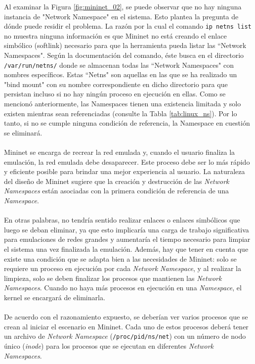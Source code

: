 Al examinar la Figura \ref{fig:mininet_02}, se puede observar que no hay ninguna instancia de "Network Namespace" en el sistema. Esto plantea la pregunta de dónde puede residir el problema. La razón por la cual el comando \texttt{ip netns list} no muestra ninguna información es que Mininet no está creando el enlace simbólico (softlink) necesario para que la herramienta pueda listar las ``Network Namespaces". Según la documentación del comando, éste busca en el directorio \texttt{/var/run/netns/} donde se almacenan todas las ``Network Namespaces" con nombres específicos. Estas ``Netns" son aquellas en las que se ha realizado un "bind mount" con su nombre correspondiente en dicho directorio para que persistan incluso si no hay ningún proceso en ejecución en ellas. Como se mencionó anteriormente, las Namespaces tienen una existencia limitada y solo existen mientras sean referenciadas (consulte la Tabla \ref{tab:linux_ns}). Por lo tanto, si no se cumple ninguna condición de referencia, la Namespace en cuestión se eliminará.\\
\\
Mininet se encarga de recrear la red emulada y, cuando el usuario finaliza la emulación, la red emulada debe desaparecer. Este proceso debe ser lo más rápido y eficiente posible para brindar una mejor experiencia al usuario. La naturaleza del diseño de Mininet sugiere que la creación y destrucción de las \textit{Network Namespaces} están asociadas con la primera condición de referencia de una \textit{Namespace}.\\
\\
En otras palabras, no tendría sentido realizar enlaces o enlaces simbólicos que luego se deban eliminar, ya que esto implicaría una carga de trabajo significativa para emulaciones de redes grandes y aumentaría el tiempo necesario para limpiar el sistema una vez finalizada la emulación. Además, hay que tener en cuenta que existe una condición que se adapta bien a las necesidades de Mininet: solo se requiere un proceso en ejecución por cada \textit{Network Namespace}, y al realizar la limpieza, solo se deben finalizar los procesos que mantienen las \textit{Network Namespaces}. Cuando no haya más procesos en ejecución en una \textit{Namespace}, el kernel se encargará de eliminarla.\\
\\
De acuerdo con el razonamiento expuesto, se deberían ver varios procesos que se crean al iniciar el escenario en Mininet. Cada uno de estos procesos deberá tener un archivo de \textit{Network Namespace} (\texttt{/proc/{pid}/ns/net}) con un número de nodo único (\textit{inode}) para los procesos que se ejecutan en diferentes \textit{Network Namespaces}.\\

